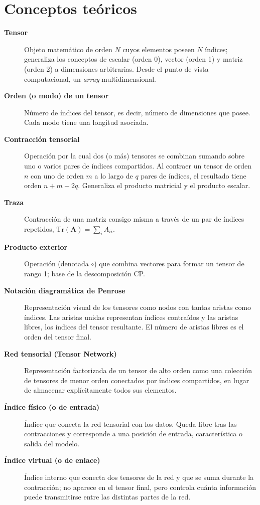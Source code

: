 \section*{Conceptos teóricos}

\begin{description}
  \item[\textbf{Tensor}] Objeto matemático de orden $N$ cuyos elementos poseen $N$ índices; generaliza los conceptos de escalar (orden 0), vector (orden 1) y matriz (orden 2) a dimensiones arbitrarias. Desde el punto de vista computacional, un \textit{array} multidimensional.
  \item[\textbf{Orden (o modo) de un tensor}] Número de índices del tensor, es decir, número de dimensiones que posee. Cada modo tiene una longitud asociada.
  \item[\textbf{Contracción tensorial}] Operación por la cual dos (o más) tensores se combinan sumando sobre uno o varios pares de índices compartidos. Al contraer un tensor de orden $n$ con uno de orden $m$ a lo largo de $q$ pares de índices, el resultado tiene orden $n+m-2q$. Generaliza el producto matricial y el producto escalar.
  \item[\textbf{Traza}] Contracción de una matriz consigo misma a través de un par de índices repetidos, $\mathrm{Tr}(\mathbf{A})=\sum_i A_{ii}$.
  \item[\textbf{Producto exterior}] Operación (denotada $\circ$) que combina vectores para formar un tensor de rango 1; base de la descomposición CP.
  \item[\textbf{Notación diagramática de Penrose}] Representación visual de los tensores como nodos con tantas aristas como índices. Las aristas unidas representan índices contraídos y las aristas libres, los índices del tensor resultante. El número de aristas libres es el orden del tensor final.
  \item[\textbf{Red tensorial (Tensor Network)}] Representación factorizada de un tensor de alto orden como una colección de tensores de menor orden conectados por índices compartidos, en lugar de almacenar explícitamente todos sus elementos.
  \item[\textbf{Índice físico (o de entrada)}] Índice que conecta la red tensorial con los datos. Queda libre tras las contracciones y corresponde a una posición de entrada, característica o salida del modelo.
  \item[\textbf{Índice virtual (o de enlace)}] Índice interno que conecta dos tensores de la red y que se suma durante la contracción; no aparece en el tensor final, pero controla cuánta información puede transmitirse entre las distintas partes de la red.

\end{description}
